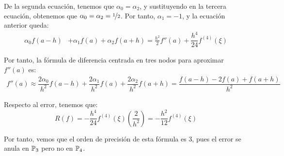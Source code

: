 \begin{ejercicio}
    De la segunda ecuación, tenemos que $\alpha_0 = \alpha_2$, y sustituyendo en la tercera ecuación, obtenemos que $\alpha_0 = \alpha_2 = \nicefrac{1}{2}$. Por tanto, $\alpha_1 = -1$, y la ecuación anterior queda:
    \begin{align*}
        \alpha_0f(a-h) &+ \alpha_1f(a) + \alpha_2f(a+h) = \frac{h^2}{2}f''(a) + \dfrac{h^4}{24}f^{(4)}(\xi)
    \end{align*}

    Por tanto, la fórmula de diferencia centrada en tres nodos para aproximar $f''(a)$ es:
    \begin{align*}
        f''(a) \approx \dfrac{2\alpha_0}{h^2}f(a-h) + \dfrac{2\alpha_1}{h^2}f(a) + \dfrac{2\alpha_2}{h^2}f(a+h) = \dfrac{f(a-h) - 2f(a) + f(a+h)}{h^2}
    \end{align*}

    Respecto al error, tenemos que:
    \begin{equation*}
        R(f) = -\dfrac{h^4}{24}f^{(4)}(\xi)\left(\dfrac{2}{h^2}\right) = -\dfrac{h^2}{12}f^{(4)}(\xi)
    \end{equation*}

    Por tanto, vemos que el orden de precisión de esta fórmula es 3, pues el error se anula en $\mathbb{P}_3$ pero no en $\mathbb{P}_4$.
\end{ejercicio}

